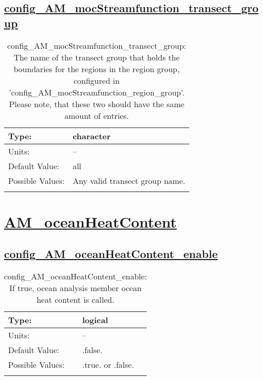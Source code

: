 \subsection[config\_AM\_mocStreamfunction\_transect\_group]{\hyperref[sec:nm_tab_AM_mocStreamfunction]{config\_AM\_mocStreamfunction\_transect\_group}}
\label{subsec:nm_sec_config_AM_mocStreamfunction_transect_group}
\begin{center}
\begin{longtable}{| p{2.0in} || p{4.0in} |}
    \hline
    Type: & character \\
    \hline
    Units: & -- \\
    \hline
    Default Value: & all \\
    \hline
    Possible Values: & Any valid transect group name. \\
    \hline
    \caption{config\_AM\_mocStreamfunction\_transect\_group: The name of the transect group that holds the boundaries for the regions in the region group, configured in 'config\_AM\_mocStreamfunction\_region\_group'. Please note, that these two should have the same amount of entries.}
\end{longtable}
\end{center}
\section[AM\_oceanHeatContent]{\hyperref[sec:nm_tab_AM_oceanHeatContent]{AM\_oceanHeatContent}}
\label{sec:nm_sec_AM_oceanHeatContent}
\subsection[config\_AM\_oceanHeatContent\_enable]{\hyperref[sec:nm_tab_AM_oceanHeatContent]{config\_AM\_oceanHeatContent\_enable}}
\label{subsec:nm_sec_config_AM_oceanHeatContent_enable}
\begin{center}
\begin{longtable}{| p{2.0in} || p{4.0in} |}
    \hline
    Type: & logical \\
    \hline
    Units: & -- \\
    \hline
    Default Value: & .false. \\
    \hline
    Possible Values: & .true. or .false. \\
    \hline
    \caption{config\_AM\_oceanHeatContent\_enable: If true, ocean analysis member ocean heat content is called.}
\end{longtable}
\end{center}
